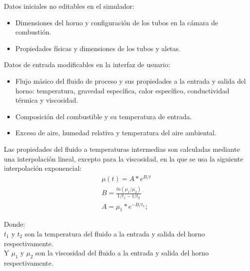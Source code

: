 \par Datos iniciales no editables en el simulador:
\begin{itemize}
    \item Dimensiones del horno y configuración de los tubos en la cámara de combustión.
    \item Propiedades físicas y dimensiones de los tubos y aletas.
\end{itemize}
\par Datos de entrada modificables en la interfaz de usuario:
\begin{itemize}
    \item Flujo másico del fluido de proceso y sus propiedades a la entrada y salida del horno: temperatura, gravedad específica, calor específico, conductividad térmica y viscosidad.
    \item Composición del combustible y su temperatura de entrada.
    \item Exceso de aire, humedad relativa y temperatura del aire ambiental.
\end{itemize}
\par Las propiedades del fluido a temperaturas intermedias son calculadas mediante una interpolación lineal, excepto para la viscosidad, en la que se usa la siguiente interpolación exponencial:
\begin{equation}
\begin{gathered}
    \mu(t) = A * e^{B/t} \\
    B = \frac{ln(\mu_1/\mu_2)}{1/t_1 - 1/t_2} \\
    A = \mu_1 * e^{-B/t_1};
\end{gathered}
\end{equation}
\par Donde:\\
$t_1$ y $t_2$ son la temperatura del fluido a la entrada y salida del horno respectivamente.\\
Y $\mu_1$ y $\mu_2$ son la viscosidad del fluido a la entrada y salida del horno respectivamente.
